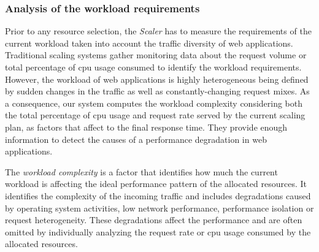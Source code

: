 


\subsubsection{Analysis of the workload requirements}

Prior to any resource selection, the \emph{Scaler} has to measure the requirements of the current workload taken into account the traffic diversity of web applications. Traditional scaling systems gather monitoring data about the request volume or total percentage of cpu usage consumed to identify the workload requirements. However, the workload of web applications is highly heterogeneous being defined by sudden changes in the traffic as well as constantly-changing request mixes. As a consequence, our system computes the workload complexity considering both the total percentage of cpu usage and request rate served by the current scaling plan,  as factors that affect to the final response time. They provide enough information to detect the causes of a performance degradation in web applications. 


The \emph{workload complexity} is a factor that identifies how much the current workload is affecting the ideal performance pattern of the allocated resources. It identifies the complexity of the incoming traffic and includes degradations caused by operating system activities, low network performance, performance isolation or request heterogeneity. These degradations affect the performance and are often omitted by individually analyzing the request rate or cpu usage consumed by the allocated resources. 

